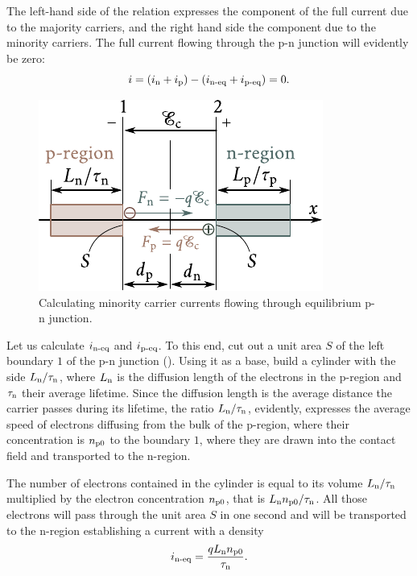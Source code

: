 \noindent
The left-hand side of the relation expresses the component of the full current due to the majority carriers, and the right hand side the component due to the minority carriers. The full current flowing through the p-n junction will evidently be zero:
\begin{equation}\label{eq:8_23}
	i = (i_{\text{n}} + i_{\text{p}}) - (i_{\text{n-eq}} + i_{\text{p-eq}}) = 0.
\end{equation}

\begin{figure}[t]
	\begin{center}
		\includegraphics[scale=1.0]{figures/ch_08/fig_8_13.pdf}
		\caption[]{Calculating minority carrier currents flowing through equilibrium p-n junction.}
		\label{fig:8_13}
	\end{center}
	\vspace{-0.8cm}
\end{figure}

Let us calculate $i_{\text{n-eq}}$ and $i_{\text{p-eq}}$. To this end, cut out a unit area $S$ of the left boundary $1$ of the p-n junction (). Using
it as a base, build a cylinder with the side $L_{\text{n}}/\tau_{\text{n}}$, where $L_{\text{n}}$ is the diffusion length of the electrons in the p-region and $\tau_{\text{n}}$ their average lifetime. Since the diffusion length is the average distance the carrier
passes during its lifetime, the ratio $L_{\text{n}}/\tau_{\text{n}}$, evidently, expresses the average speed of electrons diffusing from the bulk of the p-region, where their concentration is $n_{\text{p$0$}}$ to the boundary $1$, where they are drawn into the contact field and transported to the n-region.

The number of electrons contained in the cylinder is equal to its volume $L_{\text{n}}/\tau_{\text{n}}$ multiplied by the electron concentration $n_{\text{p$0$}}$, that is $L_{\text{n}}n_{\text{p$0$}}/\tau_{\text{n}}$. All those electrons will pass through the unit area $S$ in one second and will be transported to the n-region establishing a current with a density
\begin{equation}\label{eq:8_24}
	i_{\text{n-eq}} = \frac{q L_{\text{n}} n_{\text{p$0$}}}{\tau_{\text{n}}}.
\end{equation}

